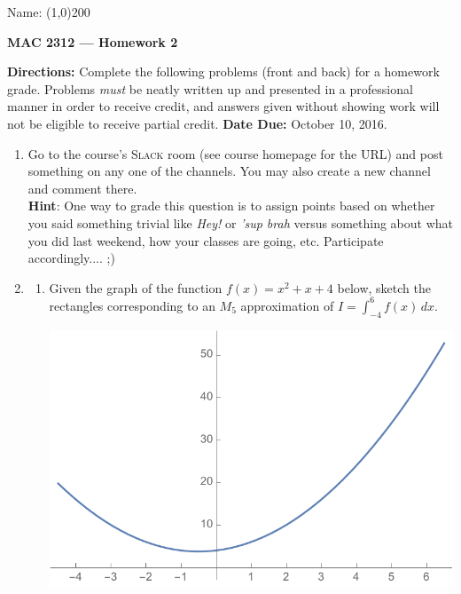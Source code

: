 \documentclass[12 pt]{article}
\newcommand{\hint}[1]{\hspace{0.5in}\textbf{Hint}: #1}
\begin{document}
\begin{flushright}Name: \line(1,0){200}\end{flushright}
\begin{center}
\Large{\textbf{MAC 2312 --- Homework 2}}
\end{center}
\textbf{Directions:} Complete the following problems (front and back) for a homework grade. Problems \textit{must} be neatly written up and presented in a professional manner in order to receive credit, and answers given without showing work will not be eligible to receive partial credit. \textbf{Date Due:} October 10, 2016.
\vspace{0.125in}
\begin{enumerate}[leftmargin=0in, rightmargin=-0.25in]
	\item Go to the course's \textsc{Slack} room (see course homepage for the URL) and post something on any one of the channels. You may also create a new channel and comment there.\\[3mm]\hint{One way to grade this question is to assign points based on whether you said something trivial like \textit{Hey!} or \textit{'sup brah} versus something about what you did last weekend, how your classes are going, etc. Participate accordingly.... ;)}
	\item \begin{enumerate}
		\item Given the graph of the function $f(x)=x^2+x+4$ below, sketch the rectangles corresponding to an $M_5$ approximation of $I=\textstyle \int_{-4}^{6}f(x)\,dx$.
		\begin{center}
		\includegraphics[scale=0.85]{graph}
		\end{center}

\end{enumerate}
\end{enumerate}
\end{document}
